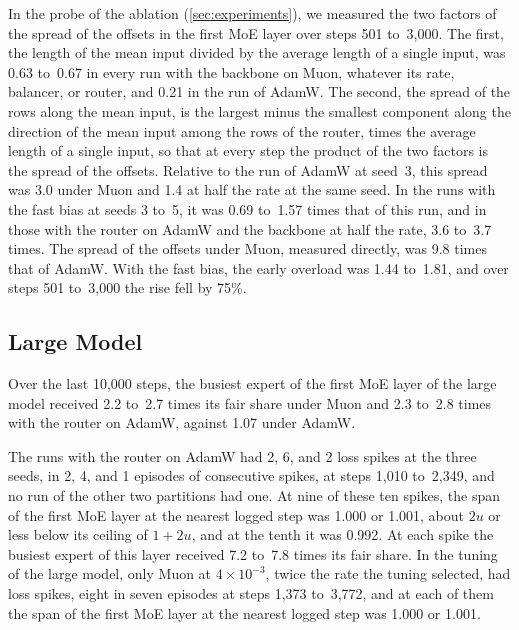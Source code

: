 \documentclass[11pt, a4paper]{article}
\begin{document}
In the probe of the ablation (\cref{sec:experiments}), we measured the two factors of the spread of the offsets in the first MoE layer over steps 501 to~3,000. The first, the length of the mean input divided by the average length of a single input, was 0.63 to~0.67 in every run with the backbone on Muon, whatever its rate, balancer, or router, and 0.21 in the run of AdamW\@. The second, the spread of the rows along the mean input, is the largest minus the smallest component along the direction of the mean input among the rows of the router, times the average length of a single input, so that at every step the product of the two factors is the spread of the offsets. Relative to the run of AdamW at seed~3, this spread was 3.0 under Muon and 1.4 at half the rate at the same seed. In the runs with the fast bias at seeds 3 to~5, it was 0.69 to~1.57 times that of this run, and in those with the router on AdamW and the backbone at half the rate, 3.6 to~3.7 times. The spread of the offsets under Muon, measured directly, was 9.8 times that of AdamW\@. With the fast bias, the early overload was 1.44 to~1.81, and over steps 501 to~3,000 the rise fell by 75\%.

\subsection{Large Model}
\label{app:large}

Over the last 10,000 steps, the busiest expert of the first MoE layer of the large model received 2.2 to~2.7 times its fair share under Muon and 2.3 to~2.8 times with the router on AdamW, against 1.07 under AdamW\@.

The runs with the router on AdamW had 2, 6, and 2 loss spikes at the three seeds, in 2, 4, and 1 episodes of consecutive spikes, at steps 1,010 to~2,349, and no run of the other two partitions had one. At nine of these ten spikes, the span of the first MoE layer at the nearest logged step was 1.000 or 1.001, about $2u$ or less below its ceiling of $1 + 2u$, and at the tenth it was 0.992. At each spike the busiest expert of this layer received 7.2 to~7.8 times its fair share. In the tuning of the large model, only Muon at $4 \times 10^{-3}$, twice the rate the tuning selected, had loss spikes, eight in seven episodes at steps 1,373 to~3,772, and at each of them the span of the first MoE layer at the nearest logged step was 1.000 or 1.001.
\end{document}

